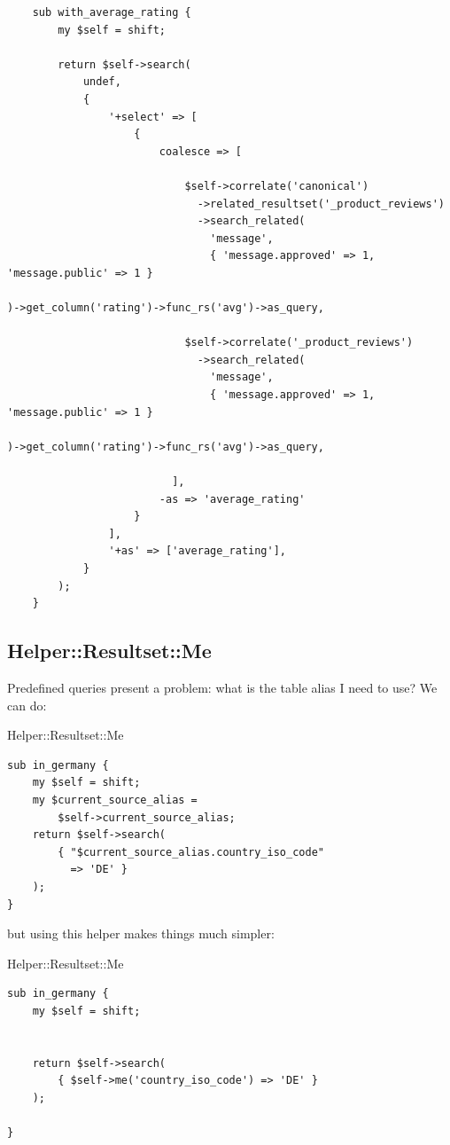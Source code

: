 \begin{lstlisting}
    sub with_average_rating {
        my $self = shift;

        return $self->search(
            undef,
            {
                '+select' => [
                    {
                        coalesce => [

                            $self->correlate('canonical')
                              ->related_resultset('_product_reviews')
                              ->search_related(
                                'message',
                                { 'message.approved' => 1,
'message.public' => 1 }
                             
)->get_column('rating')->func_rs('avg')->as_query,

                            $self->correlate('_product_reviews')
                              ->search_related(
                                'message',
                                { 'message.approved' => 1,
'message.public' => 1 }
                             
)->get_column('rating')->func_rs('avg')->as_query,

                          ],
                        -as => 'average_rating'
                    }
                ],
                '+as' => ['average_rating'],
            }
        );
    }
\end{lstlisting}

\subsection{Helper::Resultset::Me}

Predefined queries present a problem: what is the table alias I need to use?
We can do:

\begin{frame}[fragile]{Helper::Resultset::Me}
\begin{lstlisting}
sub in_germany {
    my $self = shift;
    my $current_source_alias =
        $self->current_source_alias;
    return $self->search(
        { "$current_source_alias.country_iso_code"
          => 'DE' }
    );
}
\end{lstlisting}
\end{frame}

but using this helper makes things much simpler:

\begin{frame}[fragile]{Helper::Resultset::Me}
\begin{lstlisting}
sub in_germany {
    my $self = shift;


    return $self->search(
        { $self->me('country_iso_code') => 'DE' }
    );

}
\end{lstlisting}
\end{frame}

